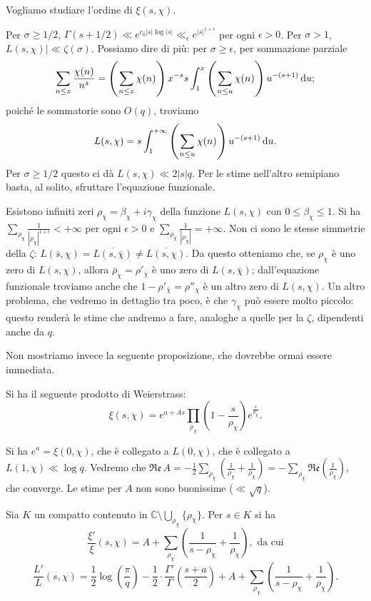Vogliamo studiare l'ordine di $\xi(s,\chi)$.

Per $\sigma \ge 1/2$, $\Gamma(s+1/2) \ll e^{c_0|s|\log{|s|}} \ll_{\epsilon} e^{|s|^{1+\epsilon}}$ per ogni $\epsilon>0$. Per $\sigma>1$, $L(s,\chi)| \ll \zeta(\sigma)$. Possiamo dire di più: per $\sigma \ge \epsilon$, per sommazione parziale
$$\sum_{n \le x} \frac{\chi(n)}{n^s}=\left(\sum_{n \le x}\chi(n)\right)x^{-s}s\int_1^x\left(\sum_{n \le u}\chi(n)\right)u^{-(s+1)}\mathop{}\!\mathrm{d} u;$$
poiché le sommatorie sono $O(q)$, troviamo
$$L(s,\chi)=s\int_1^{+\infty} \left(\sum_{n \le u}\chi(n)\right)u^{-(s+1)}\mathop{}\!\mathrm{d} u.$$
Per $\sigma \ge 1/2$ questo ci dà $L(s,\chi) \ll 2|s|q$. Per le stime nell'altro semipiano basta, al solito, sfruttare l'equazione funzionale.

Esistono infiniti zeri $\rho_\chi=\beta_\chi+i\gamma_\chi$ della funzione $L(s,\chi)$ con $0 \le \beta_\chi \le 1$. Si ha $\displaystyle \sum_{\rho_\chi} \frac{1}{|\rho_\chi|^{1+\epsilon}}<+\infty$ per ogni $\epsilon>0$ e $\displaystyle \sum_{\rho_\chi} \frac{1}{|\rho_\chi|}=+\infty$.
Non ci sono le stesse simmetrie della $\zeta$: $L(\bar{s},\chi)=\overline{L(s,\bar{\chi})}\not=\overline{L(s,\chi)}$. Da questo otteniamo che, se $\rho_\chi$ è uno zero di $L(s,\chi)$, allora $\bar{\rho}_\chi=\rho'_{\bar{\chi}}$ è uno zero di $L(s,\bar{\chi})$; dall'equazione funzionale troviamo anche che $1-\rho'_{\bar{\chi}}=\rho''_\chi$ è un altro zero di $L(s,\chi)$.
Un altro problema, che vedremo in dettaglio tra poco, è che $\gamma_\chi$ può essere molto piccolo: questo renderà le stime che andremo a fare, analoghe a quelle per la $\zeta$, dipendenti anche da $q$.

Non mostriamo invece la seguente proposizione, che dovrebbe ormai essere immediata.

\begin{prop}
  Si ha il seguente prodotto di Weierstrass:
  $$\xi(s,\chi)=e^{a+As}\prod_{\rho_\chi}\left(1-\frac{s}{\rho_\chi}\right)e^{\frac{s}{\rho_\chi}}.$$
\end{prop}

Si ha $e^a=\xi(0,\chi)$, che è collegato a $L(0,\chi)$, che è collegato a $L(1,\chi) \ll \log{q}$. Vedremo che $\displaystyle \mathfrak{Re}\,A=-\frac{1}{2}\sum_{\rho_\chi}\left(\frac{1}{\rho_\chi}+\frac{1}{\bar{\rho}_\chi}\right)=-\sum_{\rho_\chi} \mathfrak{Re}\left(\frac{1}{\rho_\chi}\right)$, che converge. Le stime per $A$ non sono buonissime ($\ll \sqrt{q}$).

\begin{cor} \label{derlogxielle}
  Sia $K$ un compatto contenuto in $\mathbb{C} \setminus \displaystyle \bigcup_{\rho_\chi} \{\rho_\chi\}$. Per $s \in K$ si ha
  $$\frac{\xi'}{\xi}(s,\chi)=A+\sum_{\rho_\chi} \left(\frac{1}{s-\rho_\chi}+\frac{1}{\rho_\chi}\right), \text{ da cui}$$
  $$\frac{L'}{L}(s,\chi)=\frac{1}{2}\log\left(\frac{\pi}{q}\right)-\frac{1}{2}\cdot\frac{\Gamma'}{\Gamma}\left(\frac{s+a}{2}\right)+A+\sum_{\rho_\chi}\left(\frac{1}{s-\rho_\chi}+\frac{1}{\rho_\chi}\right).$$
\end{cor}

